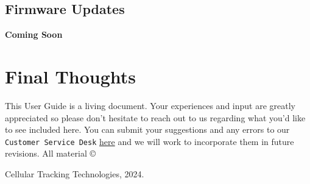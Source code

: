 \documentclass[
]{article}
\begin{document}
\hypertarget{firmware-updates}{%
\subsection{Firmware Updates}\label{firmware-updates}}

\textbf{Coming Soon}

\hypertarget{final-thoughts}{%
\section{Final Thoughts}\label{final-thoughts}}

This User Guide is a living document. Your experiences and input are
greatly appreciated so please don't hesitate to reach out to us
regarding what you'd like to see included here. You can submit your
suggestions and any errors to our \texttt{Customer\ Service\ Desk}
\href{https://celltracktech.com/pages/customer-service-desk-csd}{here}
and we will work to incorporate them in future revisions. All material ©

Cellular Tracking Technologies, 2024.

\newpag
\end{document}
